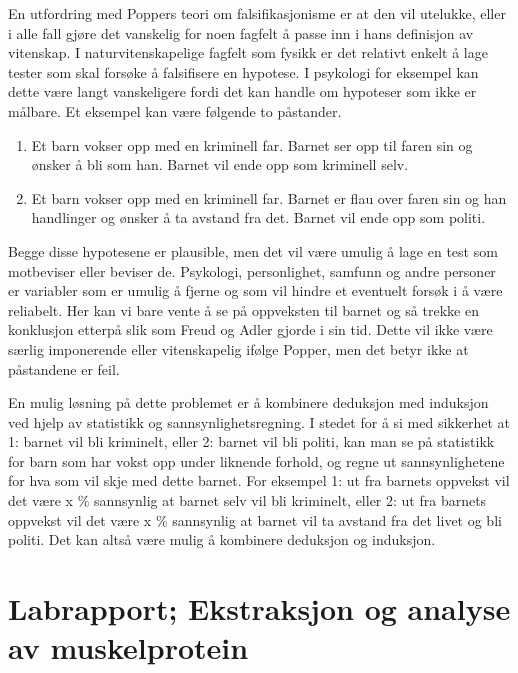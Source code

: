 \documentclass[
  letterpaper,
  DIV=11,
  numbers=noendperiod]{scrreprt}
\begin{document}
En utfordring med Poppers teori om falsifikasjonisme er at den vil
utelukke, eller i alle fall gjøre det vanskelig for noen fagfelt å passe
inn i hans definisjon av vitenskap. I naturvitenskapelige fagfelt som
fysikk er det relativt enkelt å lage tester som skal forsøke å
falsifisere en hypotese. I psykologi for eksempel kan dette være langt
vanskeligere fordi det kan handle om hypoteser som ikke er målbare. Et
eksempel kan være følgende to påstander.

\begin{enumerate}
\def\labelenumi{\arabic{enumi}.}
\item
  Et barn vokser opp med en kriminell far. Barnet ser opp til faren sin
  og ønsker å bli som han. Barnet vil ende opp som kriminell selv.
\item
  Et barn vokser opp med en kriminell far. Barnet er flau over faren sin
  og han handlinger og ønsker å ta avstand fra det. Barnet vil ende opp
  som politi.
\end{enumerate}

Begge disse hypotesene er plausible, men det vil være umulig å lage en
test som motbeviser eller beviser de. Psykologi, personlighet, samfunn
og andre personer er variabler som er umulig å fjerne og som vil hindre
et eventuelt forsøk i å være reliabelt. Her kan vi bare vente å se på
oppveksten til barnet og så trekke en konklusjon etterpå slik som Freud
og Adler gjorde i sin tid. Dette vil ikke være særlig imponerende eller
vitenskapelig ifølge Popper, men det betyr ikke at påstandene er feil.

En mulig løsning på dette problemet er å kombinere deduksjon med
induksjon ved hjelp av statistikk og sannsynlighetsregning. I stedet for
å si med sikkerhet at 1: barnet vil bli kriminelt, eller 2: barnet vil
bli politi, kan man se på statistikk for barn som har vokst opp under
liknende forhold, og regne ut sannsynlighetene for hva som vil skje med
dette barnet. For eksempel 1: ut fra barnets oppvekst vil det være x \%
sannsynlig at barnet selv vil bli kriminelt, eller 2: ut fra barnets
oppvekst vil det være x \% sannsynlig at barnet vil ta avstand fra det
livet og bli politi. Det kan altså være mulig å kombinere deduksjon og
induksjon.


\chapter{Labrapport; Ekstraksjon og analyse av
muskelprotein}\label{labrapport-ekstraksjon-og-analyse-av-muskelprotein}
\end{document}
